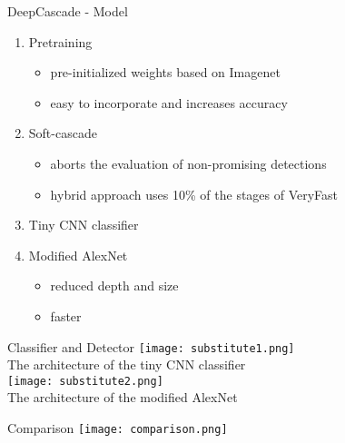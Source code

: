 \begin{frame}{DeepCascade - Model}
\small
\begin{enumerate}
  \item Pretraining
  \begin{itemize}
    \item pre-initialized weights based on Imagenet
    \item easy to incorporate and increases accuracy
  \end{itemize}

  \item Soft-cascade
  \begin{itemize}
    \item aborts the evaluation of non-promising detections
    \item hybrid approach uses 10\% of the stages of VeryFast
  \end{itemize}

  \item Tiny CNN classifier

  \item Modified AlexNet
  \begin{itemize}
    \item reduced depth and size
    \item faster
  \end{itemize}
\end{enumerate}
\end{frame}

\begin{frame}{Classifier and Detector}
  \small
\centering
  \texttt{[image: substitute1.png]}  \\
  The architecture of the tiny CNN classifier\\
  \vspace{1cm}
  \texttt{[image: substitute2.png]}  \\
  The architecture of the modified AlexNet
\end{frame}

\begin{frame}{Comparison}
  \centering
    \texttt{[image: comparison.png]}
\end{frame}
